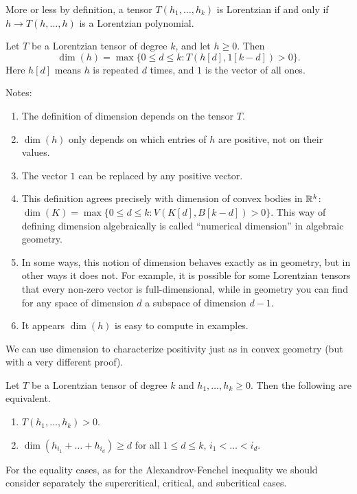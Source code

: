 \documentclass[12pt]{article}
\begin{document}
More or less by definition, a tensor $T(h_1, \ldots, h_k)$ is Lorentzian if and only if $h \to T(h, \ldots, h)$ is a Lorentzian polynomial. 

\begin{defn}
	Let $T$ be a Lorentzian tensor of degree $k$, and let $h \geq 0$. Then 
	\[
		\dim (h) = \max \{ 0 \leq d \leq k: T(h[d], 1[k-d]) > 0\}.
	\]
	Here $h[d]$ means $h$ is repeated $d$ times, and $1$ is the vector of all ones. 
\end{defn}	
Notes:
\begin{enumerate}
	\item The definition of dimension depends on the tensor $T$. 
	\item $\dim (h)$ only depends on which entries of $h$ are positive, not on their values. 
	\item The vector $1$ can be replaced by any positive vector. 
	\item This definition agrees precisely with dimension of convex bodies in $\mathbb{R}^k$: $\dim (K) = \max \{0 \leq d \leq k : V(K[d], B[k-d]) > 0\}$. This way of defining dimension algebraically is called ``numerical dimension'' in algebraic geometry. 
	\item In some ways, this notion of dimension behaves exactly as in geometry, but in other ways it does not. For example, it is possible for some Lorentzian tensors that every non-zero vector is full-dimensional, while in geometry you can find for any space of dimension $d$ a subspace of dimension $d-1$. 
	\item It appears $\dim (h)$ is easy to compute in examples. 
\end{enumerate}

We can use dimension to characterize positivity just as in convex geometry (but with a very different proof). 

\begin{prop}
	Let $T$ be a Lorentzian tensor of degree $k$ and $h_1, \ldots, h_k \geq 0$. Then the following are equivalent. 
	\begin{enumerate}[label = (\arabic*)]
		\item $T(h_1, \ldots, h_k) > 0$. 
		\item $\dim (h_{i_1} + \ldots + h_{i_d}) \geq d$ for all $1 \leq d \leq k$, $i_1 < \ldots < i_d$. 
	\end{enumerate}
\end{prop}

For the equality cases, as for the Alexandrov-Fenchel inequality we should consider separately the supercritical, critical, and subcritical cases. 
\end{document}
